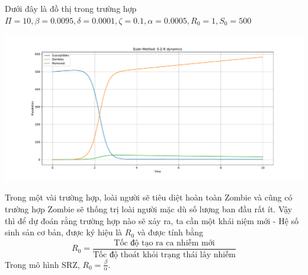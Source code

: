 \documentclass[12pt]{scrartcl}
\begin{document}
Dưới đây là đồ thị trong trường hợp $\Pi = 10,
\beta = 0.0095,
\delta = 0.0001,
\zeta = 0.1,
\alpha = 0.0005, R_0 = 1, S_0 = 500$
\begin{center}
    \includegraphics[width=1\textwidth]{Figure_1.pdf}
\end{center}

Trong một vài trường hợp, loài người sẽ tiêu diệt hoàn toàn Zombie và cũng có trường hợp Zombie sẽ thống trị loài người mặc dù số lượng ban đầu rất ít. Vậy thì để dự đoán rằng trường hợp nào sẽ xảy ra, ta cần một khái niệm mới - Hệ số sinh sản cơ bản, được ký hiệu là $R_0$ và được tính bằng 
\[
    R_0 = \frac{\text{Tốc độ tạo ra ca nhiễm mới}}{\text{Tốc độ thoát khỏi trạng thái lây nhiễm}} 
\]
Trong mô hình SRZ, $R_0 = \frac{\beta}{\alpha}$. 
\end{document}

